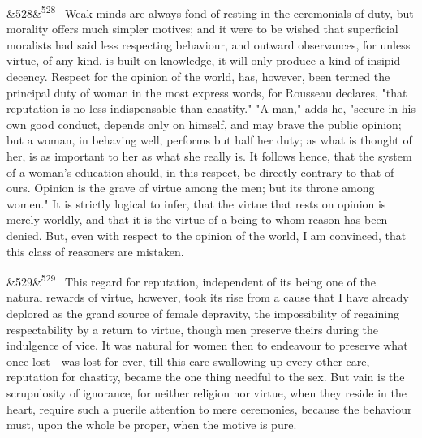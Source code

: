 \documentclass[12pt]{article}
\newcommand{\para}[1][]{\par\noindent\ifx&#1&\else\textsuperscript{\footnotesize #1}~\fi}
\begin{document}
\para[528] Weak minds are always fond of resting in the ceremonials of duty, but morality offers much simpler motives; and it were to be wished that superficial moralists had said less respecting behaviour, and outward observances, for unless virtue, of any kind, is built on knowledge, it will only produce a kind of insipid decency. Respect for the opinion of the world, has, however, been termed the principal duty of woman in the most express words, for Rousseau declares, "that reputation is no less indispensable than chastity." "A man," adds he, "secure in his own good conduct, depends only on himself, and may brave the public opinion; but a woman, in behaving well, performs but half her duty; as what is thought of her, is as important to her as what she really is. It follows hence, that the system of a woman's education should, in this respect, be directly contrary to that of ours. Opinion is the grave of virtue among the men; but its throne among women." It is strictly logical to infer, that the virtue that rests on opinion is merely worldly, and that it is the virtue of a being to whom reason has been denied. But, even with respect to the opinion of the world, I am convinced, that this class of reasoners are mistaken.

\para[529] This regard for reputation, independent of its being one of the natural rewards of virtue, however, took its rise from a cause that I have already deplored as the grand source of female depravity, the impossibility of regaining respectability by a return to virtue, though men preserve theirs during the indulgence of vice. It was natural for women then to endeavour to preserve what once lost---was lost for ever, till this care swallowing up every other care, reputation for chastity, became the one thing needful to the sex. But vain is the scrupulosity of ignorance, for neither religion nor virtue, when they reside in the heart, require such a puerile attention to mere ceremonies, because the behaviour must, upon the whole be proper, when the motive is pure.
\end{document}
